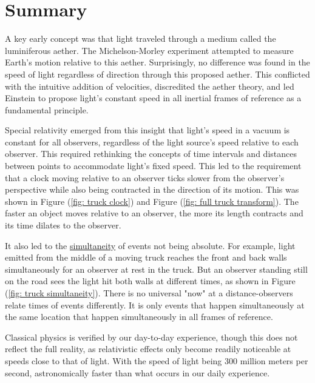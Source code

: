 \section{Summary}\label{sect: Summary chapter 1}

A key early concept was that light traveled through a medium called the luminiferous aether.
The Michelson-Morley experiment attempted to measure Earth's motion relative to this aether.
Surprisingly, no difference was found in the speed of light regardless of direction through this proposed aether.
This conflicted with the intuitive addition of velocities, discredited the aether theory, and led Einstein to propose light's constant speed in all inertial frames of reference as a fundamental principle.

Special relativity emerged from this insight that light's speed in a vacuum is constant for all observers, regardless of the light source's speed relative to each observer.
This required rethinking the concepts of time intervals and distances between points to accommodate light's fixed speed.
This led to the requirement that a clock moving relative to an observer ticks slower from the observer's perspective while also being contracted in the direction of its motion.
This was shown in Figure (\ref{fig: truck clock}) and Figure (\ref{fig: full truck transform}).
The faster an object moves relative to an observer, the more its length contracts and its time dilates to the observer.

It also led to the \hyperlink{def-simultaneity}{simultaneity} of events not being absolute.
For example, light emitted from the middle of a moving truck reaches the front and back walls simultaneously for an observer at rest in the truck.
But an observer standing still on the road sees the light hit both walls at different times, as shown in Figure (\ref{fig: truck simultaneity}).
There is no universal "now" at a distance-observers relate times of events differently.
It is only events that happen simultaneously at the same location that happen simultaneously in all frames of reference.

Classical physics is verified by our day-to-day experience, though this does not reflect the full reality, as relativistic effects only become readily noticeable at speeds close to that of light.
With the speed of light being 300 million meters per second, astronomically faster than what occurs in our daily experience.

